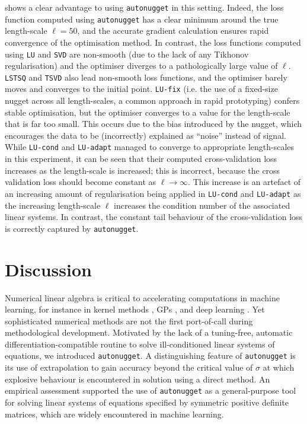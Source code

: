 \documentclass[10pt]{article} %
\newcommand{\nugget}{\sigma}
\begin{document}
 shows a clear advantage to using \texttt{autonugget} in this setting. 
Indeed, the loss function computed using \texttt{autonugget} has a clear minimum around the true length-scale $\ell = 50$, and the accurate gradient calculation ensures rapid convergence of the optimisation method.
In contrast, the loss functions computed using \texttt{LU} and \texttt{SVD} are non-smooth (due to the lack of any Tikhonov regularisation) and the optimiser diverges to a pathologically large value of $\ell$. \texttt{LSTSQ} and \texttt{TSVD} also lead non-smooth loss functions, and the optimiser barely moves and converges to the initial point.
\texttt{LU-fix} (i.e. the use of a fixed-size nugget across all length-scales, a common approach in rapid prototyping) confers stable optimisation, but the optimiser converges to a value for the length-scale that is far too small. 
This occurs due to the bias introduced by the nugget, which encourages the data to be (incorrectly) explained as ``noise'' instead of signal. 
While \texttt{LU-cond} and \texttt{LU-adapt} managed to converge to appropriate length-scales in this experiment, it can be seen that their computed cross-validation loss increases as the length-scale is increased; this is incorrect, because the cross validation loss should become constant as $\ell \rightarrow \infty$.
This increase is an artefact of an increasing amount of regularisation being applied in \texttt{LU-cond} and \texttt{LU-adapt} as the increasing length-scale $\ell$ increases the condition number of the associated linear systems.
In contrast, the constant tail behaviour of the cross-validation loss is correctly captured by \texttt{autonugget}. 





\section{Discussion}
Numerical linear algebra is critical to accelerating computations in machine learning, for instance in kernel methods \citep{rudi2017falkon}, GPs \citep{chen2025sparse}, and deep learning \citep{sato2024scaled}.
Yet sophisticated numerical methods are not the first port-of-call during methodological development.
Motivated by the lack of a tuning-free, automatic differentiation-compatible routine to solve ill-conditioned linear systems of equations, we introduced \texttt{autonugget}.
A distinguishing feature of \texttt{autonugget} is its use of extrapolation to gain accuracy beyond the critical value of $\nugget$ at which explosive behaviour is encountered in solution using a direct method.
An empirical assessment supported the use of \texttt{autonugget} as a general-purpose tool for solving linear systems of equations specified by symmetric positive definite matrices, which are widely encountered in machine learning. 
\end{document}
